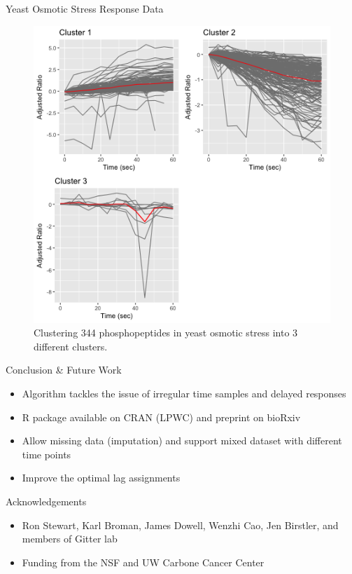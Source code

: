 \documentclass[10pt]{beamer}
\begin{document}
\begin{frame}{Yeast Osmotic Stress Response Data}
\begin{figure}
     \includegraphics[width=0.65\linewidth]{yeast_cluster_lLPC.png}
      \caption{Clustering 344 phosphopeptides in yeast osmotic stress into 3 different clusters. }
       \label{fig:ariscore}
    \end{figure}

\end{frame}




\begin{frame}{Conclusion \& Future Work}
\begin{itemize}
\item Algorithm tackles the issue of irregular time samples and delayed responses
\item R package available on CRAN (LPWC) and preprint on bioRxiv
\item Allow missing data (imputation) and support mixed dataset with different time points
\item Improve the optimal lag assignments
\end{itemize}
\end{frame}


\begin{frame}{Acknowledgements}

\begin{itemize}
\item Ron Stewart, Karl Broman, James Dowell, Wenzhi Cao, Jen Birstler, and members of Gitter lab
\item Funding from the NSF and UW Carbone Cancer Center
\end{itemize}

\end{frame}



\end{document}
